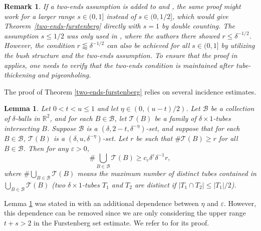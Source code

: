\documentclass{amsart}
\numberwithin{equation}{section}
\newtheorem{lemma}[theorem]{Lemma}
\newtheorem{remark}[theorem]{Remark}
\newcommand{\de}{\delta}
\newcommand{\e}{\varepsilon}
\newcommand{\cb}{\mathcal B}
\newcommand{\ZR}{\mathbb{R}}
\newcommand{\cT}{{\mathcal T}}
\begin{document}
\begin{remark}
\rm \label{rmk: two-ends-furstenberg}
If a two-ends assumption is added to \cite[Theorem 1.1]{Demeter-Wang} and \cite[Proposition 4.2]{Demeter-Wang}, the same proof might work for a larger range $s\in (0,1]$ instead of $s\in(0,1/2]$, which would give Theorem~\ref{two-ends-furstenberg} directly with $s=1$ by double counting.  
The assumption $s\leq 1/2$ was only used in \cite[Section 8, Step 3]{Demeter-Wang}, where the authors there showed $r\leq \delta^{-1/2}$. 
However, the condition $r\lessapprox \delta^{-1/2}$ can also be achieved for all $s\in (0,1]$ by utilizing the bush structure and the two-ends assumption. 
To ensure that the proof in \cite{Demeter-Wang} applies, one needs to verify that the two-ends condition is maintained after tube-thickening and pigeonholing.  
\end{remark}


\smallskip

The proof of Theorem \ref{two-ends-furstenberg} relies on several incidence estimates.


\begin{lemma}
\label{furstenberg-upper-range-pre}
Let $0<t<u\leq 1$ and let $\eta\in(0, (u-t)/2 )$.
Let $\cb$ be a collection of $\de$-balls in $\ZR^2$, and for each $B\in\cb$, let $\cT(B)$ be a family of $\de\times1$-tubes intersecting $B$.
Suppose $\cb$ is a $(\de,2-t,\de^{-\eta})$-set,
and suppose that for each $B\in\cb$, $\cT(B)$ is a $(\de,u,\de^{-\eta})$-set.
Let $r$ be such that $\#\cT(B)\geq r$ for all $B\in\cb$.
Then for any $\e>0$, 
\begin{equation}
    \#\bigcup_{B\in\cb}\cT(B)\geq c_\e\de^\e \de^{-1}r,
\end{equation}
where $ \#\bigcup_{B\in\cb}\cT(B)$ means the maximum number of distinct tubes contained in $\bigcup_{B\in\cb}\cT(B)$  (two $\delta\times 1$-tubes $T_1$ and $T_2$ are distinct if $|T_1\cap T_2|\leq |T_1|/2$). 
\end{lemma}


Lemma \ref{furstenberg-upper-range-pre} was stated in \cite[Theorem 4.1]{ren2023furstenberg} with an additional dependence between $\eta$ and $\e$.
However, this dependence can be removed since we are only considering the upper range $t+s>2$ in the Furstenberg set estimate. 
We refer to \cite[Proposition 4.2]{ren2023furstenberg} for its proof.
\end{document}
